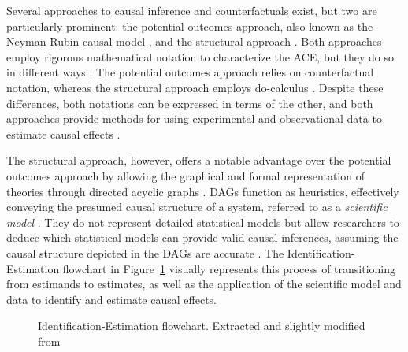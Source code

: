 \documentclass[
  authoryear,
  preprint,
  1p]{elsarticle}
\begin{document}
Several approaches to causal inference and counterfactuals exist, but
two are particularly prominent: the potential outcomes approach, also
known as the Neyman-Rubin causal model
\citep{Neyman_et_al_1923, Rubin_1974}, and the structural approach
\citep{Pearl_2009, Pearl_et_al_2016}. Both approaches employ rigorous
mathematical notation to characterize the ACE, but they do so in
different ways \citep{Neal_2020}. The potential outcomes approach relies
on counterfactual notation, whereas the structural approach employs
do-calculus \citep{Pearl_2009}. Despite these differences, both
notations can be expressed in terms of the other, and both approaches
provide methods for using experimental and observational data to
estimate causal effects \citep{Pearl_2010}.

The structural approach, however, offers a notable advantage over the
potential outcomes approach by allowing the graphical and formal
representation of theories through directed acyclic graphs
\citep[DAG,][]{Pearl_2009, Pearl_et_al_2016, Gross_et_al_2018, Neal_2020}.
DAGs function as heuristics, effectively conveying the presumed causal
structure of a system, referred to as a \emph{scientific model}
\citep{McElreath_2020}. They do not represent detailed statistical
models but allow researchers to deduce which statistical models can
provide valid causal inferences, assuming the causal structure depicted
in the DAGs are accurate \citep{McElreath_2020}. The
Identification-Estimation flowchart in Figure~\ref{fig-IEflow} visually
represents this process of transitioning from estimands to estimates, as
well as the application of the scientific model and data to identify and
estimate causal effects.

\begin{figure}


\caption{\label{fig-IEflow}Identification-Estimation flowchart.
Extracted and slightly modified from \citet[32]{Neal_2020}}

\end{figure}%
\end{document}
